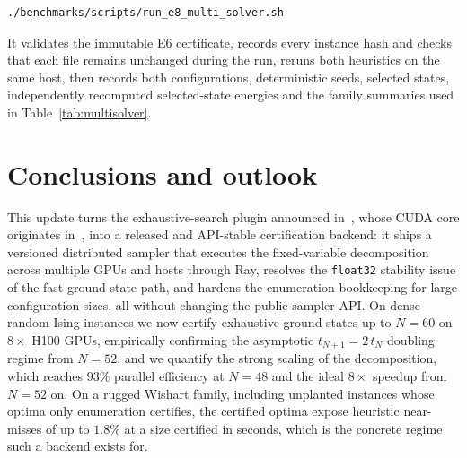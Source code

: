 \documentclass[12pt,a4paper]{elsarticle}
\begin{document}
\begin{lstlisting}[language=bash,caption={Re-running dSB and simulated annealing on the twenty certified family instances},label={lst:multisolver}]
./benchmarks/scripts/run_e8_multi_solver.sh
\end{lstlisting}

It validates the immutable E6 certificate, records every instance hash and checks that each
file remains unchanged during the run, reruns both heuristics on the same host, then records
both configurations, deterministic seeds, selected states,
independently recomputed selected-state energies and the family summaries used in
Table~\ref{tab:multisolver}.

\section{Conclusions and outlook}
\label{sec:conclusions}
This update turns the exhaustive-search plugin announced
in~\cite{jalowiecki2021omnisolver}, whose CUDA core originates
in~\cite{jalowiecki2021brute}, into a released and API-stable certification
backend: it ships a versioned distributed sampler that executes the
fixed-variable decomposition across multiple GPUs and hosts through Ray,
resolves the \texttt{float32} stability issue of the fast ground-state path, and
hardens the enumeration bookkeeping for large configuration sizes, all without
changing the public sampler API. On dense random Ising instances we now certify
exhaustive ground states up to $N=60$ on $8\times$ H100 GPUs, empirically
confirming the asymptotic $t_{N+1}=2\,t_N$ doubling regime from $N=52$, and we
quantify the strong scaling of the decomposition, which reaches $93\%$ parallel
efficiency at $N=48$ and the ideal $8\times$ speedup from $N=52$ on. On a rugged
Wishart family, including unplanted instances whose optima only enumeration
certifies, the certified optima expose heuristic near-misses of up to $1.8\%$
at a size certified in seconds, which is the concrete regime such a backend
exists for.
\end{document}

